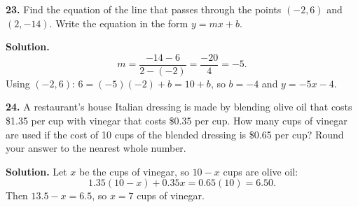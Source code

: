 \documentclass{ximera}
\begin{document}
\begin{problem}

\textbf{23.} Find the equation of the line that passes through the points $(-2,6)$ and
$(2,-14)$. Write the equation in the form $y=mx+b$.

\begin{hint}
\textbf{Solution.}
\[
  m=\frac{-14-6}{2-(-2)}=\frac{-20}{4}=-5 .
\]
Using $(-2,6)$: $6=(-5)(-2)+b=10+b$, so $b=-4$ and $y=-5x-4$.
\end{hint}
\end{problem}

\begin{problem}

\textbf{24.} A restaurant's house Italian dressing is made by blending olive oil that
costs \$1.35 per cup with vinegar that costs \$0.35 per cup. How many cups of vinegar are
used if the cost of 10 cups of the blended dressing is \$0.65 per cup? Round your answer
to the nearest whole number.

\begin{hint}
\textbf{Solution.} Let $x$ be the cups of vinegar, so $10-x$ cups are olive oil:
\[
  1.35(10-x)+0.35x = 0.65(10)=6.50 .
\]
Then $13.5-x=6.5$, so $x=7$ cups of vinegar.
\end{hint}
\end{problem}
\end{document}
